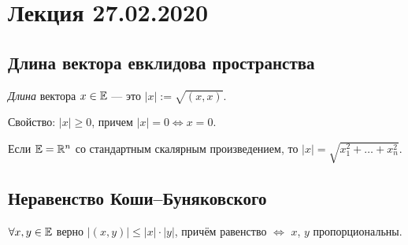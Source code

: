 \section{Лекция 27.02.2020}


\begin{comment}
    Всякое подпространство $U \subseteq E$ тоже является евклидовым пространством со скалярным произведением $(\bigcdot, \bigcdot) \big|_U \leftarrow$ ограничение на $U$.
\end{comment}


\subsection{Длина вектора евклидова пространства}

\begin{definition}
    \textit{Длина} вектора $x \in \mathbb{E}$ --- это $|x| := \sqrt{(x, x)}$.

    Свойство: 
    $|x| \geq 0$, причем $|x| = 0 \iff x = 0$.
\end{definition}

\begin{example}
    Если $\mathbb{E} = \mathbb{R}^n$ со стандартным скалярным произведением, то $|x| = \sqrt{x_1^2 + \dots + x_n^2}$.
\end{example}

\begin{comment}
    Если $\EE = \text{Mat}_{m \times n}(\RR)$, $(A, B) = \tr(A^{T} B)$

    Тогда, $|A| = \sqrt{\sum_{i = 1}^{m} \sum_{j = 1}^{n} a_{ij}^2} \leftarrow$ это обозначается как $\norm{A}_{F}$ и называется \textit{нормой Фробениуса}, \textit{фробениусовой нормой}.
\end{comment}


\subsection{Неравенство Коши–Буняковского}

\begin{proposal}
    $\forall x, y \in \mathbb{E}$ верно $|(x, y)| \leq |x| \cdot |y|$, причём равенство $\iff$ $x$, $y$ пропорциональны.
\end{proposal}


